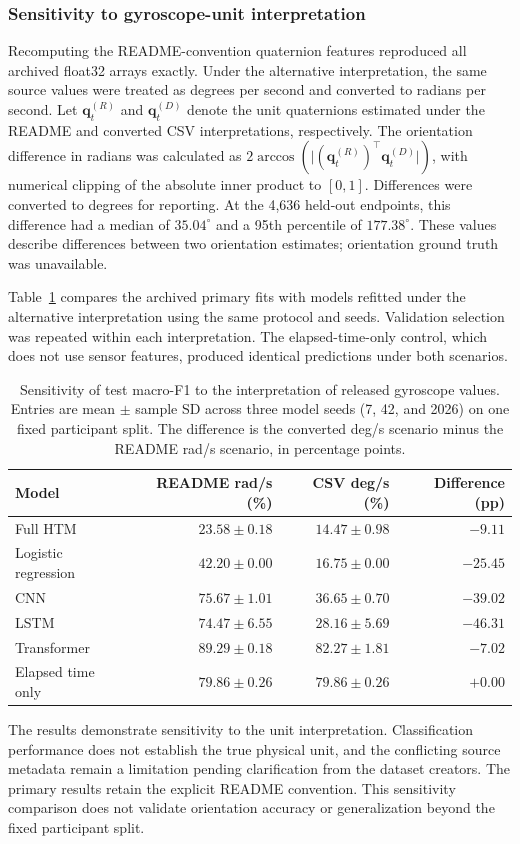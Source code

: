 
\subsubsection{Sensitivity to gyroscope-unit interpretation}

Recomputing the README-convention quaternion features reproduced all
archived float32 arrays exactly. Under the alternative interpretation,
the same source values were treated as degrees per second and converted
to radians per second. Let $\mathbf q_t^{(R)}$ and $\mathbf q_t^{(D)}$
denote the unit quaternions estimated under the README and converted
CSV interpretations, respectively. The orientation difference in radians
was calculated as $2\arccos(\lvert(\mathbf q_t^{(R)})^\top\mathbf q_t^{(D)}\rvert)$,
with numerical clipping of the absolute inner product to $[0,1]$.
Differences were converted to degrees for reporting.
At the 4,636 held-out endpoints, this difference had a median of
$35.04^\circ$ and a 95th percentile of $177.38^\circ$.
These values describe differences between two orientation estimates;
orientation ground truth was unavailable.

Table~\ref{tab:gyro_unit_sensitivity} compares the archived primary
fits with models refitted under the alternative interpretation using
the same protocol and seeds. Validation selection was repeated within
each interpretation. The elapsed-time-only control, which does not use
sensor features, produced identical predictions under both scenarios.

\begin{table}[htbp]
\caption{Sensitivity of test macro-F1 to the interpretation of released
gyroscope values. Entries are mean $\pm$ sample SD across three model
seeds (7, 42, and 2026) on one fixed participant split. The difference is the converted
deg/s scenario minus the README rad/s scenario, in percentage points.}
\label{tab:gyro_unit_sensitivity}
\centering
\small
\begin{tabular}{lrrr}
\hline
Model & README rad/s (\%) & CSV deg/s (\%) & Difference (pp) \\
\hline
Full HTM & $23.58 \pm 0.18$ & $14.47 \pm 0.98$ & $-9.11$ \\
Logistic regression & $42.20 \pm 0.00$ & $16.75 \pm 0.00$ & $-25.45$ \\
CNN & $75.67 \pm 1.01$ & $36.65 \pm 0.70$ & $-39.02$ \\
LSTM & $74.47 \pm 6.55$ & $28.16 \pm 5.69$ & $-46.31$ \\
Transformer & $89.29 \pm 0.18$ & $82.27 \pm 1.81$ & $-7.02$ \\
Elapsed time only & $79.86 \pm 0.26$ & $79.86 \pm 0.26$ & $+0.00$ \\
\hline
\end{tabular}
\end{table}

The results demonstrate sensitivity to the unit interpretation.
Classification performance does not establish the true physical unit,
and the conflicting source metadata remain a limitation pending
clarification from the dataset creators. The primary results retain the
explicit README convention. This sensitivity comparison does not
validate orientation accuracy or generalization beyond the fixed
participant split.

